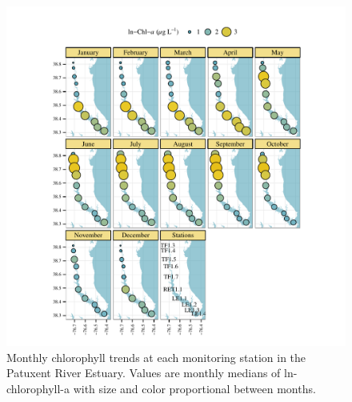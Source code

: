 \documentclass[letterpaper,12pt,oneside]{article}\usepackage[]{graphicx}\usepackage[]{color}
\makeatletter
\def\maxwidth{ %
  \ifdim\Gin@nat@width>\linewidth
    \linewidth
  \else
    \Gin@nat@width
  \fi
}
\makeatother
\begin{document}
\begin{figure}[!ht]

{\centering \includegraphics[width=\maxwidth]{figs/chlmo-1} 

}

\caption[Monthly chlorophyll trends at each monitoring station in the Patuxent River Estuary]{Monthly chlorophyll trends at each monitoring station in the Patuxent River Estuary.  Values are monthly medians of ln-chlorophyll-a with size and color proportional between months.}\label{fig:chlmo}
\end{figure}
\end{document}
